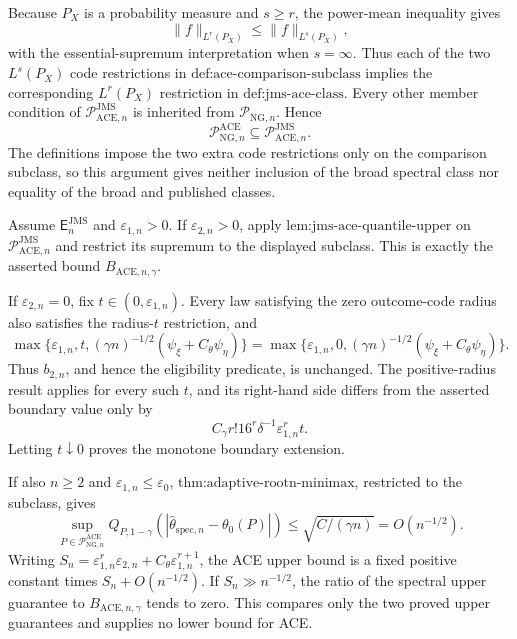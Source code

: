 Because \(P_X\) is a probability measure and \(s\ge r\), the power-mean inequality gives
\[
 \|f\|_{L^r(P_X)}\le\|f\|_{L^s(P_X)},
\]
with the essential-supremum interpretation when \(s=\infty\).  Thus each of the two \(L^s(P_X)\) code restrictions in \(\text{def:ace-comparison-subclass}\) implies the corresponding \(L^r(P_X)\) restriction in \(\text{def:jms-ace-class}\).  Every other member condition of \(\mathcal P_{\mathrm{ACE},n}^{\mathrm{JMS}}\) is inherited from \(\mathcal P_{\mathrm{NG},n}\).  Hence
\[
 \mathcal P_{\mathrm{NG},n}^{\mathrm{ACE}}
 \subseteq\mathcal P_{\mathrm{ACE},n}^{\mathrm{JMS}}.
\]
The definitions impose the two extra code restrictions only on the comparison subclass, so this argument gives neither inclusion of the broad spectral class nor equality of the broad and published classes.

Assume \(\mathsf E_n^{\mathrm{JMS}}\) and \(\varepsilon_{1,n}>0\).  If \(\varepsilon_{2,n}>0\), apply \(\text{lem:jms-ace-quantile-upper}\) on \(\mathcal P_{\mathrm{ACE},n}^{\mathrm{JMS}}\) and restrict its supremum to the displayed subclass.  This is exactly the asserted bound \(B_{\mathrm{ACE},n,\gamma}\).

If \(\varepsilon_{2,n}=0\), fix \(t\in(0,\varepsilon_{1,n})\).  Every law satisfying the zero outcome-code radius also satisfies the radius-\(t\) restriction, and
\[
 \max\{\varepsilon_{1,n},t,
 (\gamma n)^{-1/2}(\psi_{\xi}+C_{\theta}\psi_{\eta})\}
 =
 \max\{\varepsilon_{1,n},0,
 (\gamma n)^{-1/2}(\psi_{\xi}+C_{\theta}\psi_{\eta})\}.
\]
Thus \(b_{2,n}\), and hence the eligibility predicate, is unchanged.  The positive-radius result applies for every such \(t\), and its right-hand side differs from the asserted boundary value only by
\[
 C_{\gamma}r!16^r\delta^{-1}\varepsilon_{1,n}^rt.
\]
Letting \(t\downarrow0\) proves the monotone boundary extension.

If also \(n\ge2\) and \(\varepsilon_{1,n}\le\varepsilon_0\), \(\text{thm:adaptive-rootn-minimax}\), restricted to the subclass, gives
\[
 \sup_{P\in\mathcal P_{\mathrm{NG},n}^{\mathrm{ACE}}}
 Q_{P,1-\gamma}(|\widehat\theta_{\mathrm{spec},n}-\theta_0(P)|)
 \le \sqrt{C/(\gamma n)}=O(n^{-1/2}).
\]
Writing \(S_n=\varepsilon_{1,n}^r\varepsilon_{2,n}+C_{\theta}\varepsilon_{1,n}^{r+1}\), the ACE upper bound is a fixed positive constant times \(S_n+O(n^{-1/2})\).  If \(S_n\gg n^{-1/2}\), the ratio of the spectral upper guarantee to \(B_{\mathrm{ACE},n,\gamma}\) tends to zero.  This compares only the two proved upper guarantees and supplies no lower bound for ACE.